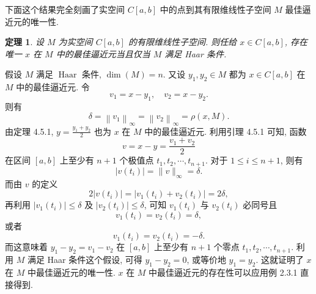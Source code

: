 \documentclass[openany]{ctexbook}
\makeatletter
\theoremstyle{kaiti}
\newtheorem{theorem}{定理}[section]
\theoremstyle{normal}
\renewenvironment{proof}[1][\proofname]{\par
    \pushQED{\qed}%
    \normalfont \topsep6\p@\@plus6\p@\relax
    \trivlist
    \item\relax
    {\heiti #1}\hspace{2\labelsep}\ignorespaces
  }{%
    \popQED\endtrivlist\@endpefalse
  }
\makeatother
\begin{document}
下面这个结果完全刻画了实空间 $C[a, b]$ 中的点到其有限维线性子空间 $M$ 最佳逼近元的唯一性.

\begin{theorem}
设 $M$ 为实空间 $C[a, b]$ 的有限维线性子空间. 则任给 $x \in C[a, b]$, 存在唯一 $x$ 在 $M$ 中的最佳逼近元当且仅当 $M$ 满足 Haar 条件.
\end{theorem}

\begin{proof}
假设 $M$ 满足 $\operatorname{Haar}$ 条件, $\operatorname{dim}(M)=n$. 又设 $y_1, y_2 \in M$ 都为 $x \in C[a, b]$ 在 $M$ 中的最佳逼近元. 令
$$
v_1=x-y_1, \quad v_2=x-y_2.
$$
则有
$$
\delta=\left\|v_1\right\|_{\infty}=\left\|v_2\right\|_{\infty}=\rho(x, M).
$$
由定理 4.5.1, $y=\frac{y_1+y_2}{2}$ 也为 $x$ 在 $M$ 中的最佳逼近元. 利用引理 4.5.1 可知, 函数
$$
v=x-y=\frac{v_1+v_2}{2}
$$
在区间 $[a, b]$ 上至少有 $n+1$ 个极值点 $t_1, t_2, \cdots, t_{n+1}$. 对于 $1 \leqslant i \leqslant n+1$, 则有
$$
\left|v\left(t_{i}\right)\right|=\|v\|_{\infty}=\delta.
$$
而由 $v$ 的定义
$$
2\left|v\left(t_{i}\right)\right|=\left|v_1\left(t_{i}\right)+v_2\left(t_{i}\right)\right|=2 \delta,
$$
再利用 $\left|v_1\left(t_{i}\right)\right| \leqslant \delta$ 及 $\left|v_2\left(t_{i}\right)\right| \leqslant \delta$, 可知 $v_1\left(t_{i}\right)$ 与 $v_2\left(t_{i}\right)$ 必同号且
$$
v_1\left(t_{i}\right)=v_2\left(t_{i}\right)=\delta,
$$
或者
$$
v_1\left(t_{i}\right)=v_2\left(t_{i}\right)=-\delta.
$$
而这意味着 $y_1-y_2=v_1-v_2$ 在 $[a, b]$ 上至少有 $n+1$ 个零点 $t_1, t_2, \cdots, t_{n+1}$. 利用 $M$ 满足 Haar 条件这个假设, 可得 $y_1-y_2=0$, 或等价地 $y_1=y_2$. 这就证明了 $x$ 在 $M$ 中最佳逼近元的唯一性. $x$ 在 $M$ 中最佳逼近元的存在性可以应用例 2.3.1 直接得到.


\end{proof}
\end{document}
